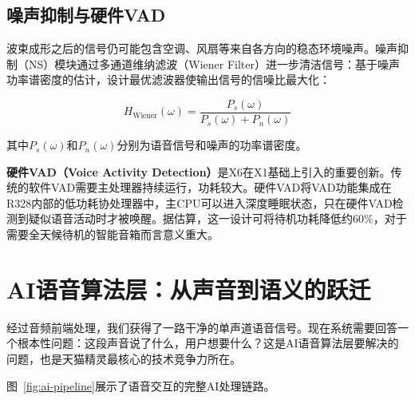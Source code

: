 \documentclass[12pt, a4paper, twoside, openright]{book}
\begin{document}
\section{噪声抑制与硬件VAD}

波束成形之后的信号仍可能包含空调、风扇等来自各方向的稳态环境噪声。噪声抑制（NS）模块通过多通道维纳滤波（Wiener Filter）进一步清洁信号：基于噪声功率谱密度的估计，设计最优滤波器使输出信号的信噪比最大化：

\begin{equation}
  H_{\text{Wiener}}(\omega) = \frac{P_s(\omega)}{P_s(\omega) + P_n(\omega)}
\end{equation}

其中$P_s(\omega)$和$P_n(\omega)$分别为语音信号和噪声的功率谱密度。

\textbf{硬件VAD（Voice Activity Detection）}是X6在X1基础上引入的重要创新。传统的软件VAD需要主处理器持续运行，功耗较大。硬件VAD将VAD功能集成在R328内部的低功耗协处理器中，主CPU可以进入深度睡眠状态，只在硬件VAD检测到疑似语音活动时才被唤醒。据估算，这一设计可将待机功耗降低约60\%，对于需要全天候待机的智能音箱而言意义重大。

\chapter{AI语音算法层：从声音到语义的跃迁}
\label{chap:ai}

经过音频前端处理，我们获得了一路干净的单声道语音信号。现在系统需要回答一个根本性问题：这段声音说了什么，用户想要什么？这是AI语音算法层要解决的问题，也是天猫精灵最核心的技术竞争力所在。

图~\ref{fig:ai-pipeline}展示了语音交互的完整AI处理链路。
\end{document}
